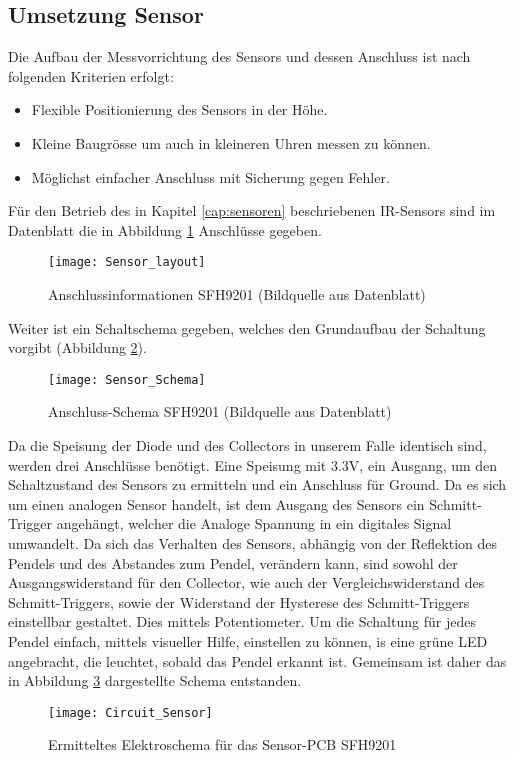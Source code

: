 \subsection{Umsetzung Sensor}
	Die Aufbau der Messvorrichtung des Sensors und dessen Anschluss ist nach folgenden Kriterien erfolgt:
	\begin{itemize}
		\item Flexible Positionierung des Sensors in der Höhe.
		\item Kleine Baugrösse um auch in kleineren Uhren messen zu können.
		\item Möglichst einfacher Anschluss mit Sicherung gegen Fehler.
	\end{itemize}
	Für den Betrieb des in Kapitel \ref{cap:sensoren} beschriebenen IR-Sensors sind im Datenblatt die in Abbildung \ref{fig:info_SFH9201} Anschlüsse gegeben.
	\begin{figure}[H]
		\centering
		\texttt{[image: Sensor\_layout]}
		\caption{Anschlussinformationen SFH9201 (Bildquelle aus Datenblatt)}
		\label{fig:info_SFH9201}
	\end{figure}
	Weiter ist ein Schaltschema gegeben, welches den Grundaufbau der Schaltung vorgibt (Abbildung \ref{fig:schema_SFH9201}).
	\begin{figure}[H]
		\centering
		\texttt{[image: Sensor\_Schema]}
		\caption{Anschluss-Schema SFH9201 (Bildquelle aus Datenblatt)}
		\label{fig:schema_SFH9201}
	\end{figure}
	Da die Speisung der Diode und des Collectors in unserem Falle identisch sind, werden drei Anschlüsse benötigt. Eine Speisung mit 3.3V, ein Ausgang, um den Schaltzustand des Sensors zu ermitteln und ein Anschluss für Ground. Da es sich um einen analogen Sensor handelt, ist dem Ausgang des Sensors ein Schmitt-Trigger angehängt, welcher die Analoge Spannung in ein digitales Signal umwandelt. Da sich das Verhalten des Sensors, abhängig von der Reflektion des Pendels und des Abstandes zum Pendel, verändern kann, sind sowohl der Ausgangswiderstand für den Collector, wie auch der Vergleichswiderstand des Schmitt-Triggers, sowie der Widerstand der Hysterese des Schmitt-Triggers einstellbar gestaltet. Dies mittels Potentiometer. Um die Schaltung für jedes Pendel einfach, mittels visueller Hilfe, einstellen zu können, is eine grüne LED angebracht, die leuchtet, sobald das Pendel erkannt ist. Gemeinsam ist daher das in Abbildung \ref{fig:schema_sensor} dargestellte Schema entstanden.
	\begin{figure}[H]
		\centering
		\texttt{[image: Circuit\_Sensor]}
		\caption{Ermitteltes Elektroschema für das Sensor-PCB SFH9201}
		\label{fig:schema_sensor}
	\end{figure}
